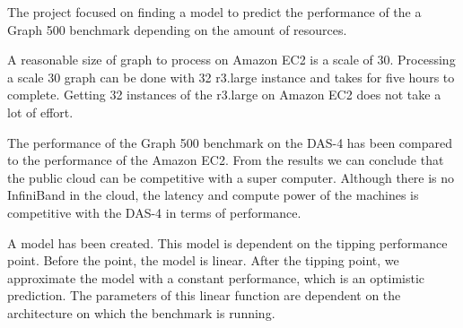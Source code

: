 The project focused on finding a model to predict the performance of the a Graph 500 benchmark depending on the amount of resources.

A reasonable size of graph to process on Amazon EC2 is a scale of 30. Processing a scale 30 graph can  be done with 32 r3.large instance and takes for five hours to complete. Getting 32 instances of the r3.large on Amazon EC2 does not take a lot of effort.

The performance of the Graph 500 benchmark on the DAS-4 has been compared to the performance of the Amazon EC2. From the results we can conclude that the public cloud can be competitive with a super computer. Although there is no InfiniBand in the cloud, the latency and compute power of the machines is competitive with the DAS-4 in terms of performance.
 
A model has been created. This model is dependent on the tipping performance point. Before the point, the model is linear. After the tipping point, we approximate the model with a constant performance, which is an optimistic prediction. The parameters of this linear function are dependent on the architecture on which the benchmark is running.